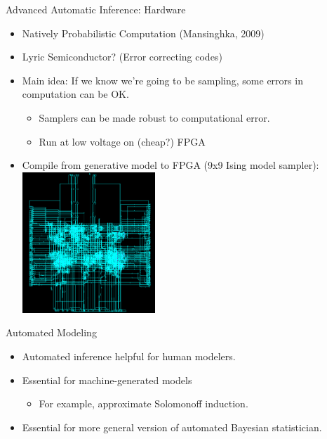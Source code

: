 \begin{frame}{Advanced Automatic Inference: Hardware}
    \begin{itemize}
      \item Natively Probabilistic Computation {\color{DarkBlue}  (Mansinghka, 2009) }
      \item Lyric Semiconductor? (Error correcting codes)
      \item Main idea: If we know we're going to be sampling, some errors in computation can be OK.
          \begin{itemize}
                \item Samplers can be made robust to computational error.
                \item Run at low voltage on (cheap?) FPGA
          \end{itemize}        
      \item Compile from generative model to FPGA (9x9 Ising model sampler):
      \\\includegraphics[width=5cm]{figures/llvm}
    \end{itemize}
\end{frame}


\begin{frame}{Automated Modeling}
    \begin{itemize}
      \item Automated inference helpful for human modelers.
      \item Essential for machine-generated models
      \begin{itemize}
        \item For example, approximate Solomonoff induction.
      \end{itemize}
      \item Essential for more general version of automated Bayesian statistician.
    \end{itemize}
\end{frame}


